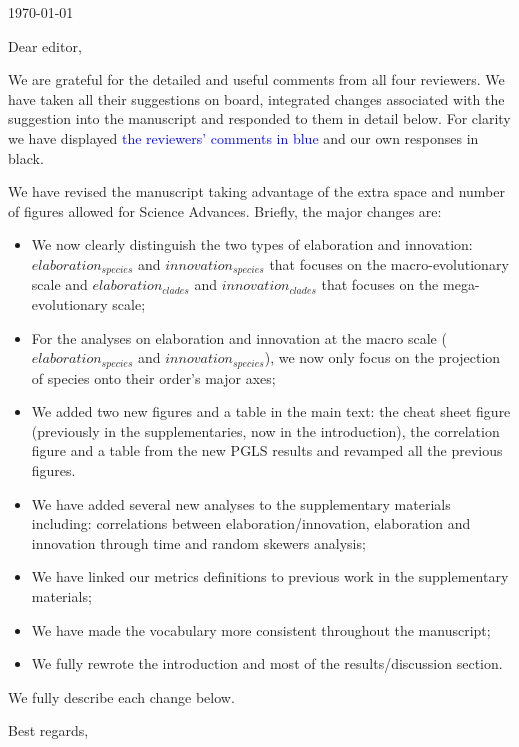 \documentclass[12pt,letterpaper]{article}
\begin{document}
\noindent \today
\bigskip

\noindent Dear editor,
\bigskip

We are grateful for the detailed and useful comments from all four reviewers. We have taken all their suggestions on board, integrated changes associated with the suggestion into the manuscript and responded to them in detail below. For clarity we have displayed \textcolor{blue}{the reviewers’ comments in blue} and our own responses in black.

We have revised  the manuscript taking advantage of the extra space and number of figures allowed for Science Advances. Briefly, the major changes are:

\begin{itemize}
    \item We now clearly distinguish the two types of elaboration and innovation: $elaboration_{species}$ and $innovation_{species}$ that focuses on the macro-evolutionary scale and $elaboration_{clades}$ and $innovation_{clades}$ that focuses on the mega-evolutionary scale;
    \item For the analyses on elaboration and innovation at the macro scale ($elaboration_{species}$ and $innovation_{species}$), we now only focus on the projection of species onto their order’s major axes;
    \item We added two new figures and a table in the main text: the cheat sheet figure (previously in the supplementaries, now in the introduction), the correlation figure and a table from the new PGLS results and revamped all the previous figures.
    \item We have added several new analyses to the supplementary materials including: correlations between elaboration/innovation, elaboration and innovation through time and random skewers analysis;
    \item We have linked our metrics definitions to previous work in the supplementary materials;
    \item We have made the vocabulary more consistent throughout the manuscript;
    \item We fully rewrote the introduction and most of the results/discussion section.
\end{itemize}

\noindent We fully describe each change below.

\bigskip

\noindent Best regards,

\bigskip
\end{document}

